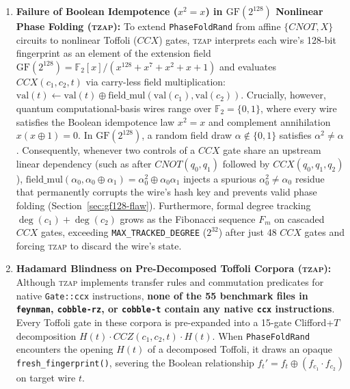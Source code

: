\documentclass[11pt,a4paper]{article}
\theoremstyle{definition}
\begin{document}
\begin{enumerate}
  \item \textbf{Failure of Boolean Idempotence ($x^2 = x$) in $\mathrm{GF}(2^{128})$ Nonlinear Phase Folding (\textsc{tzap}):} To extend \texttt{PhaseFoldRand} from affine $\{\mathit{CNOT}, X\}$ circuits to nonlinear Toffoli ($\mathit{CCX}$) gates, \textsc{tzap} interprets each wire's 128-bit fingerprint as an element of the extension field $\mathrm{GF}(2^{128}) = \mathbb{F}_2[x]/(x^{128} + x^7 + x^2 + x + 1)$ and evaluates $\mathit{CCX}(c_1, c_2, t)$ via carry-less field multiplication: $\mathrm{val}(t) \leftarrow \mathrm{val}(t) \oplus \mathrm{field\_mul}(\mathrm{val}(c_1), \mathrm{val}(c_2))$. Crucially, however, quantum computational-basis wires range over $\mathbb{F}_2 = \{0,1\}$, where every wire satisfies the Boolean idempotence law $x^2 = x$ and complement annihilation $x(x \oplus 1) = 0$. In $\mathrm{GF}(2^{128})$, a random field draw $\alpha \notin \{0,1\}$ satisfies $\alpha^2 \neq \alpha$. Consequently, whenever two controls of a $\mathit{CCX}$ gate share an upstream linear dependency (such as after $\mathit{CNOT}(q_0, q_1)$ followed by $\mathit{CCX}(q_0, q_1, q_2)$), $\mathrm{field\_mul}(\alpha_0, \alpha_0 \oplus \alpha_1) = \alpha_0^2 \oplus \alpha_0\alpha_1$ injects a spurious $\alpha_0^2 \neq \alpha_0$ residue that permanently corrupts the wire's hash key and prevents valid phase folding (Section~\ref{sec:gf128-flaw}). Furthermore, formal degree tracking $\deg(c_1) + \deg(c_2)$ grows as the Fibonacci sequence $F_m$ on cascaded $\mathit{CCX}$ gates, exceeding \texttt{MAX\_TRACKED\_DEGREE} ($2^{32}$) after just 48 $\mathit{CCX}$ gates and forcing \textsc{tzap} to discard the wire's state.
  \item \textbf{Hadamard Blindness on Pre-Decomposed Toffoli Corpora (\textsc{tzap}):} Although \textsc{tzap} implements transfer rules and commutation predicates for native \texttt{Gate::ccx} instructions, \textbf{none of the 55 benchmark files in \texttt{feynman}, \texttt{cobble-rz}, or \texttt{cobble-t} contain any native \texttt{ccx} instructions}. Every Toffoli gate in these corpora is pre-expanded into a 15-gate Clifford+$T$ decomposition $H(t)\cdot \mathit{CCZ}(c_1, c_2, t)\cdot H(t)$. When \texttt{PhaseFoldRand} encounters the opening $H(t)$ of a decomposed Toffoli, it draws an opaque \texttt{fresh\_fingerprint()}, severing the Boolean relationship $f_t' = f_t \oplus (f_{c_1} \cdot f_{c_2})$ on target wire $t$.

\end{enumerate}
\end{document}

